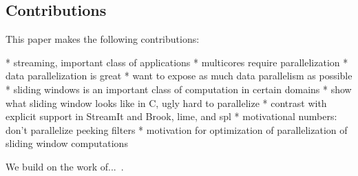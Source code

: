 \subsection{Contributions}
This paper makes the following contributions:
\mybegin
{}
\myend


* streaming, important class of applications
* multicores require parallelization
* data parallelization is great
* want to expose as much data parallelism as possible
* sliding windows is an important class of computation in certain domains
* show what sliding window looks like in C, ugly hard to parallelize
* contrast with explicit support in StreamIt and Brook, lime, and spl
* motivational numbers: don't parallelize peeking filters
* motivation for optimization of parallelization of sliding window computations



We build on the work of...~\cite{choi09}.
